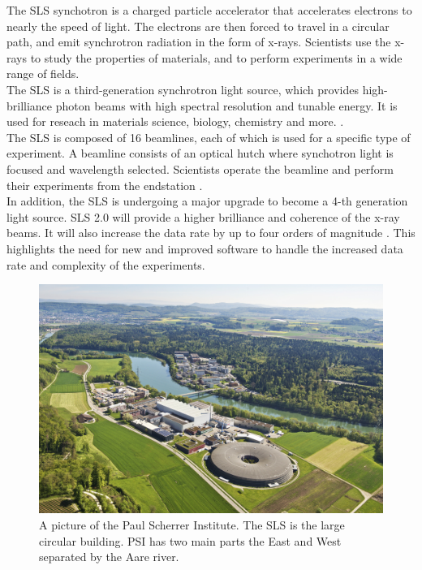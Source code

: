 \begin{spacing}{1.2}
    The SLS synchotron is a charged particle accelerator that accelerates electrons
    to nearly the speed of light. The electrons are then
    forced to travel in a circular path, and emit synchrotron radiation in the form of x-rays.
    Scientists use the x-rays to study the properties of materials, and to perform experiments in a wide range of fields.\\

    The SLS is a third-generation synchrotron light source, which provides high-brilliance photon beams
    with high spectral resolution and tunable energy. It is used for reseach in materials science,
    biology, chemistry and more. \cite{boge2002first, aboutSLS, PhysRevLett.128.024801}.\\

    The SLS is composed of 16 beamlines, each of which is used for a specific type of experiment.
    A beamline consists of an optical hutch where synchotron light is focused and
    wavelength selected. Scientists operate the beamline and perform their experiments
    from the endstation \cite{lightsource}.\\

    In addition, the SLS is undergoing a major upgrade to become a 4-th generation light source.
    SLS 2.0 will provide a higher brilliance    and coherence of the x-ray beams. It will also
    increase the data rate by up to four orders of magnitude \cite{sls2}. This highlights the need for
    new and improved software to handle the increased data rate and complexity of the experiments.\\







    \begin{figure}
        \centering
        \includegraphics[width=\textwidth]{Chapitre1/figures/psi.jpg}
        \caption{A picture of the Paul Scherrer Institute. The SLS is the large circular building.
            PSI has two main parts the East and West separated by the Aare river.}
        \label{fig:sls}
    \end{figure}


\end{spacing}
